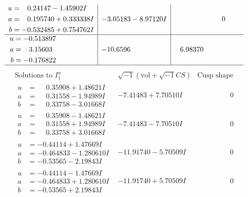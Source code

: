 \documentclass[1p]{elsarticle_modified}
\theoremstyle{definition}
\newcommand{\I}{\sqrt{-1}}
\begin{document}
$$\begin{array}{c|c|c}
\begin{aligned}
u &= \phantom{-}0.24147 - 1.45902 I \\
a &= \phantom{-}0.195740 + 0.333338 I \\
b &= -0.532485 + 0.754762 I\end{aligned}
 & -3.05183 - 8.97120 I & \phantom{-0.000000 } 0 \\ \hline\begin{aligned}
u &= -0.513897\phantom{ +0.000000I} \\
a &= \phantom{-}3.15603\phantom{ +0.000000I} \\
b &= -0.176822\phantom{ +0.000000I}\end{aligned}
 & -10.6596\phantom{ +0.000000I} & \phantom{-}6.98370\phantom{ +0.000000I}\\
 \hline 
 \end{array}$$\newpage$$\begin{array}{c|c|c}  
\text{Solutions to }I^u_{1}& \I (\text{vol} + \sqrt{-1}CS) & \text{Cusp shape}\\
 \hline 
\begin{aligned}
u &= \phantom{-}0.35908 + 1.48621 I \\
a &= \phantom{-}0.31558 - 1.94989 I \\
b &= \phantom{-}0.33758 - 3.01668 I\end{aligned}
 & -7.41483 + 7.70510 I & \phantom{-0.000000 } 0 \\ \hline\begin{aligned}
u &= \phantom{-}0.35908 - 1.48621 I \\
a &= \phantom{-}0.31558 + 1.94989 I \\
b &= \phantom{-}0.33758 + 3.01668 I\end{aligned}
 & -7.41483 - 7.70510 I & \phantom{-0.000000 } 0 \\ \hline\begin{aligned}
u &= -0.44114 + 1.47669 I \\
a &= -0.464833 - 1.280610 I \\
b &= -0.53565 - 2.19843 I\end{aligned}
 & -11.91740 - 5.70509 I & \phantom{-0.000000 } 0 \\ \hline\begin{aligned}
u &= -0.44114 - 1.47669 I \\
a &= -0.464833 + 1.280610 I \\
b &= -0.53565 + 2.19843 I\end{aligned}
 & -11.91740 + 5.70509 I & \phantom{-0.000000 } 0 \\ \hline\begin{aligned}

\end{aligned}
\end{array}$$
\end{document}
